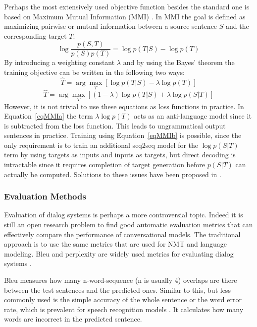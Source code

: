 \documentclass[12pt]{article}
\begin{document}
Perhaps the most extensively used objective function besides the standard one is based on Maximum Mutual Information (MMI) \cite{Li:2015}. In MMI the goal is defined as maximizing pairwise or mutual information between a source sentence \(S\) and the corresponding target \(T\):
\begin{equation}
\log{\frac{p(S,T)}{p(S)p(T)}}=\log{p(T|S)}-\log{p(T)}
\end{equation}
By introducing a weighting constant \(\lambda\) and by using the Bayes' theorem the training objective can be written in the following two ways:
\begin{equation} \label{eqMMIa}
\hat{T}=\arg\max_{T}[\log{p(T|S)}-\lambda\log{p(T)}]
\end{equation}
\begin{equation} \label{eqMMIb}
\hat{T}=\arg\max_{T}[(1-\lambda)\log{p(T|S)}+\lambda\log{p(S|T)}]
\end{equation}
However, it is not trivial to use these equations as loss functions in practice. In Equation~\ref{eqMMIa} the term \(\lambda\log{p(T)}\) acts as an anti-language model since it is subtracted from the loss function. This leads to ungrammatical output sentences in practice. Training using Equation~\ref{eqMMIb} is possible, since the only requirement is to train an additional seq2seq model for the \(\log{p(S|T)}\) term by using targets as inputs and inputs as targets, but direct decoding is intractable since it requires completion of target generation before \(p(S|T)\) can actually be computed. Solutions to these issues have been proposed in \cite{Li:2015}.

\subsubsection{Evaluation Methods} \label{sssec:eval}
Evaluation of dialog systems is perhaps a more controversial topic. Indeed it is still an open research problem to find good automatic evaluation metrics that can effectively compare the performance of conversational models. The traditional approach is to use the same metrics that are used for NMT and language modeling. Bleu and perplexity are widely used metrics for evaluating dialog systems \cite{Vinyals:2015,Yao:2016,Zhao:2017,Serban:2015}. 

Bleu \cite{Papineni:2002} measures how many n-word-sequence (n is usually 4) overlaps are there between the test sentences and the predicted ones. Similar to this, but less commonly used is the simple accuracy of the whole sentence or the word error rate, which is prevalent for speech recognition models \cite{Shannon:2017,Park:2008}. It calculates how many words are incorrect in the predicted sentence.
\end{document}
